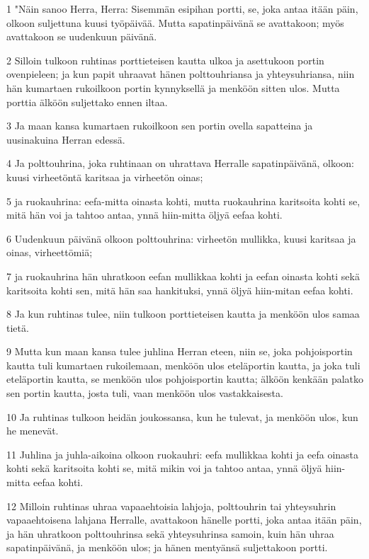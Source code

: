\par 1 "Näin sanoo Herra, Herra: Sisemmän esipihan portti, se, joka antaa itään päin, olkoon suljettuna kuusi työpäivää. Mutta sapatinpäivänä se avattakoon; myös avattakoon se uudenkuun päivänä.
\par 2 Silloin tulkoon ruhtinas porttieteisen kautta ulkoa ja asettukoon portin ovenpieleen; ja kun papit uhraavat hänen polttouhriansa ja yhteysuhriansa, niin hän kumartaen rukoilkoon portin kynnyksellä ja menköön sitten ulos. Mutta porttia älköön suljettako ennen iltaa.
\par 3 Ja maan kansa kumartaen rukoilkoon sen portin ovella sapatteina ja uusinakuina Herran edessä.
\par 4 Ja polttouhrina, joka ruhtinaan on uhrattava Herralle sapatinpäivänä, olkoon: kuusi virheetöntä karitsaa ja virheetön oinas;
\par 5 ja ruokauhrina: eefa-mitta oinasta kohti, mutta ruokauhrina karitsoita kohti se, mitä hän voi ja tahtoo antaa, ynnä hiin-mitta öljyä eefaa kohti.
\par 6 Uudenkuun päivänä olkoon polttouhrina: virheetön mullikka, kuusi karitsaa ja oinas, virheettömiä;
\par 7 ja ruokauhrina hän uhratkoon eefan mullikkaa kohti ja eefan oinasta kohti sekä karitsoita kohti sen, mitä hän saa hankituksi, ynnä öljyä hiin-mitan eefaa kohti.
\par 8 Ja kun ruhtinas tulee, niin tulkoon porttieteisen kautta ja menköön ulos samaa tietä.
\par 9 Mutta kun maan kansa tulee juhlina Herran eteen, niin se, joka pohjoisportin kautta tuli kumartaen rukoilemaan, menköön ulos eteläportin kautta, ja joka tuli eteläportin kautta, se menköön ulos pohjoisportin kautta; älköön kenkään palatko sen portin kautta, josta tuli, vaan menköön ulos vastakkaisesta.
\par 10 Ja ruhtinas tulkoon heidän joukossansa, kun he tulevat, ja menköön ulos, kun he menevät.
\par 11 Juhlina ja juhla-aikoina olkoon ruokauhri: eefa mullikkaa kohti ja eefa oinasta kohti sekä karitsoita kohti se, mitä mikin voi ja tahtoo antaa, ynnä öljyä hiin-mitta eefaa kohti.
\par 12 Milloin ruhtinas uhraa vapaaehtoisia lahjoja, polttouhrin tai yhteysuhrin vapaaehtoisena lahjana Herralle, avattakoon hänelle portti, joka antaa itään päin, ja hän uhratkoon polttouhrinsa sekä yhteysuhrinsa samoin, kuin hän uhraa sapatinpäivänä, ja menköön ulos; ja hänen mentyänsä suljettakoon portti.
